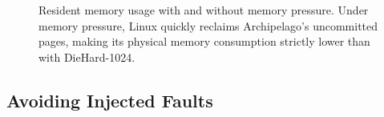 \documentclass{acm_proc_article-sp}
\begin{document}
\begin{figure}[t!]
 \centering
 \hfill
{}
\caption{Resident memory usage with and without memory pressure. Under memory pressure, Linux quickly reclaims Archipelago's uncommitted pages, making its physical memory consumption strictly lower than with DieHard-1024.}
\end{figure}



\subsection{Avoiding Injected Faults}

\label{sec:eval-injection}
\end{document}

